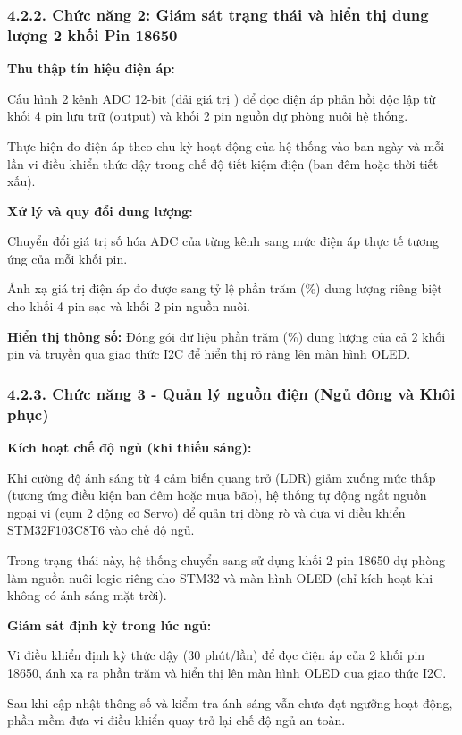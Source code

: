 \documentclass[12pt,a4paper]{report}
\begin{document}
\subsubsection*{4.2.2. Chức năng 2: Giám sát trạng thái và hiển thị dung lượng 2 khối Pin 18650 }

\textbf{Thu thập tín hiệu điện áp: }

Cấu hình 2 kênh ADC 12-bit (dải giá trị ) để đọc điện áp phản hồi độc lập từ khối 4 pin lưu trữ (output) và khối 2 pin nguồn dự phòng nuôi hệ thống.

Thực hiện đo điện áp theo chu kỳ hoạt động của hệ thống vào ban ngày và mỗi lần vi điều khiển thức dậy trong chế độ tiết kiệm điện (ban đêm hoặc thời tiết xấu). 

\textbf{Xử lý và quy đổi dung lượng: }

Chuyển đổi giá trị số hóa ADC của từng kênh sang mức điện áp thực tế tương ứng của mỗi khối pin. 

Ánh xạ giá trị điện áp đo được sang tỷ lệ phần trăm (\%) dung lượng riêng biệt cho khối 4 pin sạc và khối 2 pin nguồn nuôi. 

\textbf{Hiển thị thông số:} Đóng gói dữ liệu phần trăm (\%) dung lượng của cả 2 khối pin và truyền qua giao thức I2C để hiển thị rõ ràng lên màn hình OLED. 

\subsubsection*{4.2.3. Chức năng 3 - Quản lý nguồn điện (Ngủ đông và Khôi phục) }

\textbf{Kích hoạt chế độ ngủ (khi thiếu sáng):}

Khi cường độ ánh sáng từ 4 cảm biến quang trở (LDR) giảm xuống mức thấp (tương ứng điều kiện ban đêm hoặc mưa bão), hệ thống tự động ngắt nguồn ngoại vi (cụm 2 động cơ Servo) để quản trị dòng rò và đưa vi điều khiển STM32F103C8T6 vào chế độ ngủ.

Trong trạng thái này, hệ thống chuyển sang sử dụng khối 2 pin 18650 dự phòng làm nguồn nuôi logic riêng cho STM32 và màn hình OLED (chỉ kích hoạt khi không có ánh sáng mặt trời).

\textbf{Giám sát định kỳ trong lúc ngủ:}

Vi điều khiển định kỳ thức dậy (30 phút/lần) để đọc điện áp của 2 khối pin 18650, ánh xạ ra phần trăm và hiển thị lên màn hình OLED qua giao thức I2C.

Sau khi cập nhật thông số và kiểm tra ánh sáng vẫn chưa đạt ngưỡng hoạt động, phần mềm đưa vi điều khiển quay trở lại chế độ ngủ an toàn.
\end{document}
